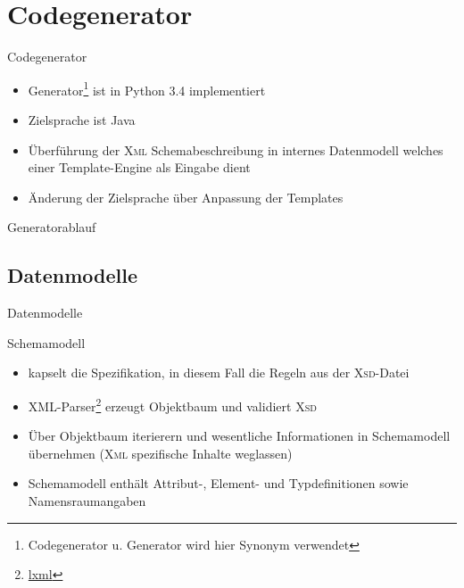 \section{Codegenerator}
\begin{frame}{Codegenerator}
    \begin{itemize}
        \item Generator\footnote{Codegenerator u. Generator wird hier Synonym verwendet} ist in Python 3.4 implementiert
        \item Zielsprache ist Java
        \item Überführung der \textsc{Xml} Schemabeschreibung in internes Datenmodell welches einer Template-Engine als Eingabe dient
        \item Änderung der Zielsprache über Anpassung der Templates
    \end{itemize}
\end{frame}

\begin{frame}{Generatorablauf}
    \centering
    \resizebox{!}{0.85\textheight}{
        
    }
    \label{fig:flow}
\end{frame}

\subsection{Datenmodelle}
\begin{frame}{Datenmodelle}
    \begin{block}{Schemamodell}
        \begin{itemize}
            \item kapselt die Spezifikation, in diesem Fall die Regeln aus der \textsc{Xsd}-Datei
            \item XML-Parser\footnote{\href{http://lxml.de/}{lxml}} erzeugt Objektbaum und validiert \textsc{Xsd}
            \item Über Objektbaum iterierern und wesentliche Informationen in Schemamodell übernehmen (\textsc{Xml} spezifische Inhalte weglassen)
            \item Schemamodell enthält Attribut-, Element- und Typdefinitionen sowie Namensraumangaben
        \end{itemize}
    \end{block}
\end{frame}

